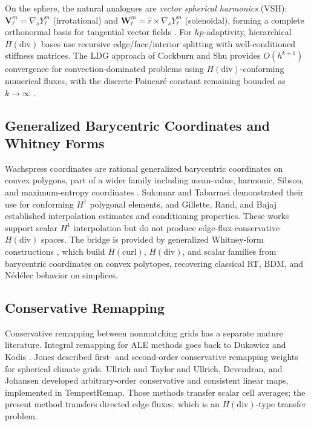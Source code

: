 On the sphere, the natural analogues are \emph{vector spherical harmonics}
(VSH): $\mathbf{V}_\ell^m = \nabla_s Y_\ell^m$ (irrotational) and
$\mathbf{W}_\ell^m = \hat{r}\times\nabla_s Y_\ell^m$ (solenoidal), forming
a complete orthonormal basis for tangential vector fields
\cite{wangVSH2017}.  For $hp$-adaptivity, hierarchical $H(\mathrm{div})$
bases \cite{zaglmayrHierarchical2006} use recursive edge/face/interior
splitting with well-conditioned stiffness matrices.  The LDG approach of
Cockburn and Shu \cite{cockburnLDG1998} provides $O(h^{k+1})$ convergence
for convection-dominated problems using $H(\mathrm{div})$-conforming
numerical fluxes, with the discrete Poincar\'{e} constant remaining bounded
as $k\to\infty$ \cite{ciarletStability2002}.

\subsection{Generalized Barycentric Coordinates and Whitney Forms}

Wachspress coordinates \cite{Wachspress1975} are rational generalized
barycentric coordinates on convex polygons, part of a wider family including
mean-value, harmonic, Sibson, and maximum-entropy coordinates
\cite{FloaterHormannKos2006,WarrenSchaeferHiraniDesbrun2007,Sibson1981,%
HormannSukumar2008}.  Sukumar and Tabarraei \cite{SukumarTabarraei2004}
demonstrated their use for conforming $H^1$ polygonal elements, and
Gillette, Rand, and Bajaj \cite{GilletteRandBajaj2012,RandGilletteBajaj2013}
established interpolation estimates and conditioning properties.  These works
support scalar $H^1$ interpolation but do not produce edge-flux-conservative
$H(\mathrm{div})$ spaces.  The bridge is provided by generalized Whitney-form
constructions \cite{GilletteRandBajaj2016}, which build $H(\mathrm{curl})$,
$H(\mathrm{div})$, and scalar families from barycentric coordinates on convex
polytopes, recovering classical RT, BDM, and N\'{e}d\'{e}lec behavior on
simplices.

\subsection{Conservative Remapping}

Conservative remapping between nonmatching grids has a separate mature
literature.  Integral remapping for ALE methods goes back to Dukowicz and
Kodis \cite{DukowiczKodis1987}.  Jones \cite{Jones1999} described first- and
second-order conservative remapping weights for spherical climate grids.
Ullrich and Taylor \cite{UllrichTaylor2015} and Ullrich, Devendran, and
Johansen \cite{UllrichDevendranJohansen2016} developed arbitrary-order
conservative and consistent linear maps, implemented in TempestRemap.  Those
methods transfer scalar cell averages; the present method transfers directed
edge fluxes, which is an $H(\mathrm{div})$-type transfer problem.

